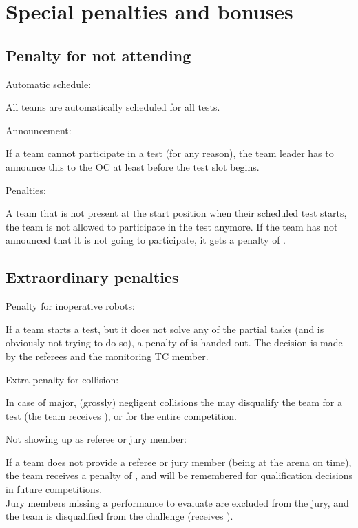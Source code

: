 \newcommand{\penaltybig}{15~}
\newcommand{\penaltysmall}{5~}


\section{Special penalties and bonuses}\label{sec:special_awards}

\subsection{Penalty for not attending}\label{rule:not_attending}
\begin{enumerate}
	{\bf\item Automatic schedule:} All teams are automatically scheduled for all tests.
	{\bf\item Announcement:} If a team cannot participate in a test (for any reason), the team leader has to announce this to the OC at least  before the test slot begins.
	{\bf\item Penalties:} A team that is not present at the start position when their scheduled test starts, the team is not allowed to participate in the test anymore. If the team has not announced that it is not going to participate, it gets a penalty of \scoring{\penaltybig points}. 
\end{enumerate}

\subsection{Extraordinary penalties}\label{rule:extraordinary_penalties}
\begin{enumerate}
	{\bf\item Penalty for inoperative robots:} If a team starts a test, but it does not solve any of the partial tasks (and is obviously not trying to do so), a penalty of \scoring{\penaltysmall points} is handed out. The decision is made by the referees and the monitoring TC member.  
	{\bf\item Extra penalty for collision:} In case of major, (grossly) negligent collisions the  may disqualify the team for a test (the team receives ), or for the entire competition.
	{\bf\item Not showing up as referee or jury member:} If a team does not provide a referee or jury member (being at the arena on time), the team receives a penalty of \scoring{\penaltybig points}, and will be remembered for qualification decisions in future competitions.\\
	Jury members missing a performance to evaluate are excluded from the jury, and the team is 	disqualified from the challenge (receives ).
\end{enumerate}

